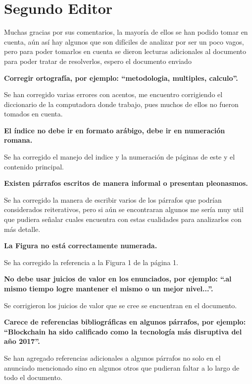 \documentclass[10pt,a4paper,roman]{moderncv}        %
\begin{document}

\section*{Segundo Editor}

Muchas gracias por sus comentarios, la mayoría de ellos se han podido tomar en cuenta, aún así hay algunos que son difíciles de analizar por ser un poco vagos, pero para poder tomarlos en cuenta se dieron lecturas adicionales al documento para poder tratar de resolverlos, espero el documento enviado 

\textbf{Corregir ortografía, por ejemplo: “metodologia, multiples, calculo”.}

Se han corregido varias errores con acentos, me encuentro corrigiendo el diccionario de la computadora donde trabajo, pues muchos de ellos no fueron tomados en cuenta.

\hfill \break
\textbf{El índice no debe ir en formato arábigo, debe ir en numeración romana.}

\hfill \break
Se ha corregido el manejo del indice y la numeración de páginas de este y el contenido principal.

\hfill \break
\textbf{Existen párrafos escritos de manera informal o presentan pleonasmos.}

\hfill \break
Se ha corregido la manera de escribir varios de los párrafos que podrían considerados reiterativos, pero si aún se encontraran algunos me sería muy util que pudiera señalar cuales encuentra con estas cualidades para analizarlos con más detalle. 

\hfill \break
\textbf{La Figura no está correctamente numerada.}

\hfill \break
Se ha corregido la referencia a la Figura 1 de la página 1.

\hfill \break
\textbf{No debe usar juicios de valor en los enunciados, por ejemplo: “.al mismo tiempo logre mantener el mismo o un mejor nivel...”.}

\hfill \break
Se corrigieron los juicios de valor que se cree se encuentran en el documento.

\hfill \break
\textbf{Carece de referencias bibliográficas en algunos párrafos, por ejemplo: “Blockchain ha sido calificado como la tecnología más disruptiva del año 2017”.}

\hfill \break
Se han agregado referencias adicionales a algunos párrafos no solo en el anunciado mencionado sino en algunos otros que pudieran faltar a lo largo de todo el documento.
\end{document}
